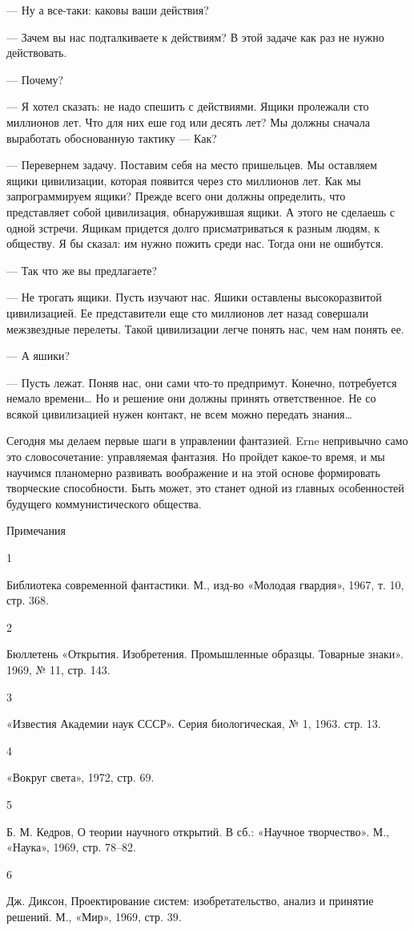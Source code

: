 — Ну а все-таки: каковы ваши действия?

— Зачем вы нас подталкиваете к действиям?  В этой задаче как раз не  нужно
действовать.

— Почему?

— Я  хотел сказать:  не надо  спешить с  действиями. Ящики  пролежали  сто
миллионов лет.  Что для  них еше  год или  десять лет?  Мы должны  сначала
выработать обоснованную тактику — Как?

— Перевернем задачу. Поставим себя на место пришельцев. Мы оставляем ящики
цивилизации,  которая   появится  через   сто   миллионов  лет.   Как   мы
запрограммируем  ящики?   Прежде   всего  они   должны   определить,   что
представляет собой цивилизация, обнаружившая ящики. А этого не сделаешь  с
одной зстречи. Ящикам  придется долго  присматриваться к  разным людям,  к
обществу. Я бы сказал: им нужно пожить среди нас. Тогда они не ошибутся.

— Так что же вы предлагаете?

— Не  трогать ящики.  Пусть изучают  нас. Яшики  оставлены  высокоразвитой
цивилизацией. Ее  представители  еще  сто миллионов  лет  назад  совершали
межзвездные перелеты. Такой цивилизации легче  понять нас, чем нам  понять
ее.

— А яшики?

— Пусть лежат. Поняв нас, они сами что-то предпримут. Конечно, потребуется
немало времени…  Но и  решение  они должны  принять ответственное.  Не  со
всякой цивилизацией нужен контакт, не всем можно передать знания…

Сегодня мы делаем первые шаги в управлении фантазией. Erne непривычно само
это словосочетание: управляемая фантазия. Но пройдет какое-то время, и  мы
научимся планомерно  развивать воображение  и на  этой основе  формировать
творческие  способности.  Быть   может,  это  станет   одной  из   главных
особенностей будущего коммунистического общества.

Примечания

1

Библиотека современной фантастики. М., изд-во «Молодая гвардия», 1967,  т.
10, стр. 368.

2

Бюллетень «Открытия. Изобретения.  Промышленные образцы. Товарные  знаки».
1969, № 11, стр. 143.

3

«Известия Академии наук СССР». Серия биологическая, № 1, 1963. стр. 13.

4

«Вокруг света», 1972, стр. 69.

5

Б. М. Кедров, О теории научного открытий. В сб.: «Научное творчество». М.,
«Наука», 1969, стр. 78–82.

6

Дж. Диксон, Проектирование систем: изобретательство, анализ и принятие
решений. М., «Мир», 1969, стр. 39.
